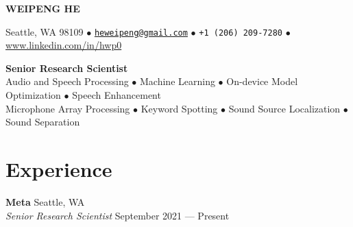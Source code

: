\documentclass[a4paper,9pt]{extarticle} %
\begin{document}
\thispagestyle{empty}


\begin{center}
  {\Huge\bfseries\sffamily WEIPENG HE}

  Seattle, WA 98109 $\bullet$
  \href{mailto:heweipeng@gmail.com}{\texttt{heweipeng@gmail.com}} $\bullet$
  \texttt{+1 (206) 209-7280} $\bullet$
  \url{www.linkedin.com/in/hwp0}
\end{center}


\begin{center}
  {\LARGE\bfseries\sffamily Senior Research Scientist} \\[4pt]
  Audio and Speech Processing $\bullet$ Machine Learning $\bullet$ On-device Model Optimization $\bullet$ Speech Enhancement \\
  Microphone Array Processing $\bullet$ Keyword Spotting $\bullet$ Sound Source Localization $\bullet$ Sound Separation
\end{center}


\section{Experience}

\textbf{Meta}  \hfill Seattle, WA \\
\textit{Senior Research Scientist} \hfill September 2021 --- Present%
\vspace{-.4\parskip}
\end{document}
